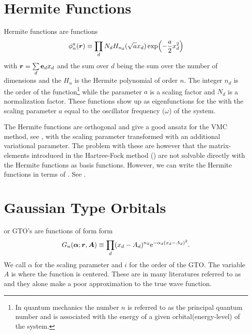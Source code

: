 \section{Hermite Functions}
    Hermite functions are functions 
        \begin{equation}
            \phi^a_n(\boldsymbol{{r}}) \equiv \prod_d N_d
            H_{n_d}(\sqrt{a}x_d)\exp(-\frac{a}{2}x^2_d)
            \label{eq:HermiteFunc}
        \end{equation}
    with $\boldsymbol{{r}} = \sum\limits_d \boldsymbol{{\mathrm{e}}}_dx_d$ and the sum over $d$ being
    the sum over the number of dimensions and the $H_n$ is the Hermite
    polynomial of order $n$. The integer $n_d$ is the order of the
    function\footnote{In quantum mechanics the number $n$ is referred to as the
    principal quantum number and is associated with the energy of a given
    orbital(energy-level) of the system.} while the parameter $a$ is a scaling
    factor and $N_d$ is a normalization factor. These functions show up as
    eigenfunctions for the \cite{GriffQuan} with the scaling parameter $a$ equal to the
    oscillator frequency ($\omega$) of the system.

    The Hermite functions are orthogonal and give a good ansatz for the VMC
    method, see , with the scaling parameter transformed with an
    additional variational parameter. The problem with these are however that
    the matrix-elements introduced in the Hartree-Fock method
    () are not solvable directly with the Hermite functions
    as basis functions. However, we can write the Hermite functions in terms of
    . See .

\section{Gaussian Type Orbitals}
     or GTO's are functions of form
    form\cite{HelgakerMolElcTheory}
        \begin{equation}
            G_n(\boldsymbol{{\alpha}};\boldsymbol{{r}},\boldsymbol{{A}}) \equiv \prod_d (x_d-A_d)^{n_d}
            \mathrm{e}^{-\alpha_d (x_d-A_d)^2}.
            \label{eq:GTOdef1d}
        \end{equation}
    We call $\alpha$ for the scaling parameter and $i$ for the order of the
    GTO. The variable $A$ is where the function is centered. These are in many
    literatures referred to as  and they alone
    make a poor approximation to the true wave function.

